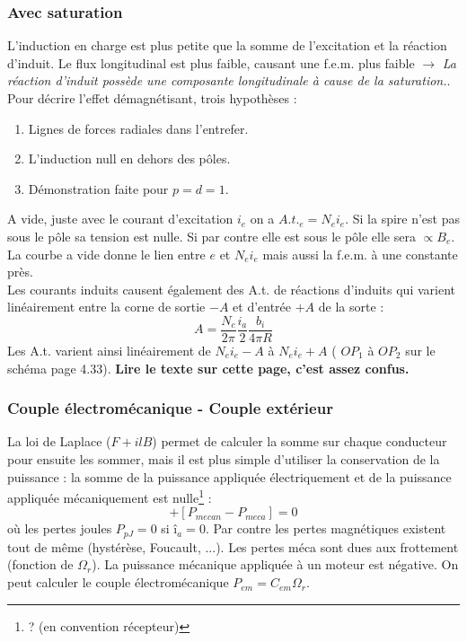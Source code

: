 		\subsubsection{Avec saturation}
		L'induction en charge est plus petite que la somme de l'excitation 
		et la réaction d'induit. Le flux longitudinal est plus faible, 
		causant une f.e.m. plus faible $\rightarrow$\textit{ La réaction 
		d'induit possède une composante longitudinale à cause de la 
		saturation.}. Pour décrire l'effet démagnétisant, trois hypothèses :
		\begin{enumerate}
		\item Lignes de forces radiales dans l'entrefer.
		\item L'induction null en dehors des pôles.
		\item Démonstration faite pour $p=d=1$.
		\end{enumerate}
		A vide, juste avec le courant d'excitation $i_e$ on a $A.t._e = 
		N_ei_e$. Si la spire n'est pas sous le pôle sa tension est nulle. 
		Si par contre elle est sous le pôle elle sera $\propto B_e$. La 
		courbe a vide donne le lien entre $e$ et $N_ei_e$ mais aussi la 
		f.e.m. à une constante près.\\
		Les courants induits causent également des A.t. de réactions 
		d'induits qui varient linéairement entre la corne de sortie $-A$ 
		et d'entrée $+A$ de la sorte :
		\begin{equation}
		A = \frac{N_c}{2\pi}\frac{i_a}{2}\frac{b_i}{4\pi R}
		\end{equation}
		Les A.t. varient ainsi linéairement de $N_ei_e-A$ à $N_ei_e+A$ (
		$OP_1$ à $OP_2$ sur le schéma page 4.33). \textbf{Lire le texte 
		sur cette page, c'est assez confus.}
		
		\subsubsection{Couple électromécanique - Couple extérieur}
		La loi de Laplace ($F+ilB$) permet de calculer la somme sur 
		chaque conducteur pour ensuite les sommer, mais il est plus 
		simple d'utiliser la conservation de la puissance : la somme 
		de la puissance appliquée électriquement et de la puissance 
		appliquée mécaniquement est nulle\footnote{? (en convention 
		récepteur)} :
		\begin{equation}
		[\underbrace{P_{electrique} - (P_{pJoule}}_{P_{electromecanique}}
		+P_{pmagn})] + [P_{mecan}-P_{meca}]=0
		\end{equation}
		où les pertes joules $P_{pJ}=0$ si $î_a=0$. Par contre les pertes 
		magnétiques existent tout de même (hystérèse, Foucault, ...). Les 
		pertes méca sont dues aux frottement (fonction de $\Omega_r$). La 
		puissance mécanique appliquée à un moteur est négative. On peut 
		calculer le couple électromécanique $P_{em} = C_{em}\Omega_r$.
		
		
		
		
		
		
		
		
		
		
		
		

